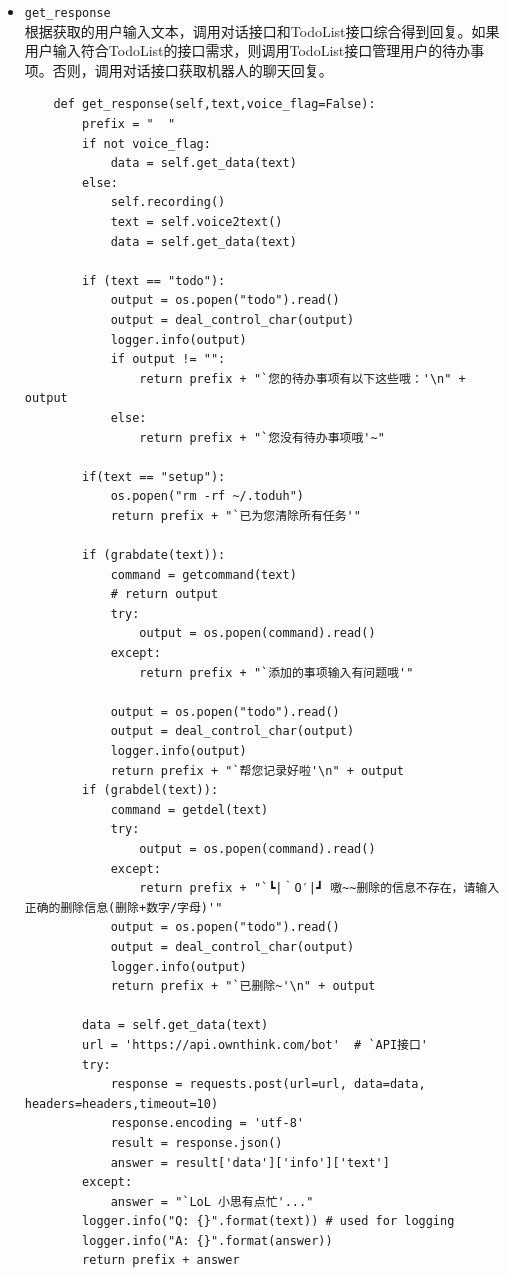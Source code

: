 \documentclass[logo,reportComp]{thesis}
\begin{document}
\begin{itemize}
\begin{itemize}
        \item \verb'get_response'\\
        根据获取的用户输入文本，调用对话接口和TodoList接口综合得到回复。如果用户输入符合TodoList的接口需求，则调用TodoList接口管理用户的待办事项。否则，调用对话接口获取机器人的聊天回复。
\begin{lstlisting}
    def get_response(self,text,voice_flag=False):
        prefix = "  "
        if not voice_flag:
            data = self.get_data(text)
        else:
            self.recording()
            text = self.voice2text()
            data = self.get_data(text)

        if (text == "todo"):
            output = os.popen("todo").read()
            output = deal_control_char(output)
            logger.info(output)
            if output != "":
                return prefix + "`您的待办事项有以下这些哦：'\n" + output
            else:
                return prefix + "`您没有待办事项哦'~"

        if(text == "setup"):
            os.popen("rm -rf ~/.toduh")
            return prefix + "`已为您清除所有任务'"

        if (grabdate(text)):
            command = getcommand(text)
            # return output
            try:
                output = os.popen(command).read()
            except:
                return prefix + "`添加的事项输入有问题哦'"

            output = os.popen("todo").read()
            output = deal_control_char(output)
            logger.info(output)
            return prefix + "`帮您记录好啦'\n" + output
        if (grabdel(text)):
            command = getdel(text)
            try:
                output = os.popen(command).read()
            except:
                return prefix + "`┗|｀O′|┛ 嗷~~删除的信息不存在，请输入正确的删除信息(删除+数字/字母)'"
            output = os.popen("todo").read()
            output = deal_control_char(output)
            logger.info(output)
            return prefix + "`已删除~'\n" + output

        data = self.get_data(text)
        url = 'https://api.ownthink.com/bot'  # `API接口'
        try:
            response = requests.post(url=url, data=data, headers=headers,timeout=10)
            response.encoding = 'utf-8'
            result = response.json()
            answer = result['data']['info']['text']
        except:
            answer = "`LoL 小思有点忙'..."
        logger.info("Q: {}".format(text)) # used for logging
        logger.info("A: {}".format(answer))
        return prefix + answer
\end{lstlisting}
        

\end{itemize}
\end{itemize}
\end{document}
